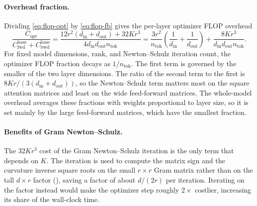 \documentclass[11pt]{article}
\theoremstyle{plain}
\theoremstyle{definition}
\theoremstyle{remark}
\theoremstyle{definition}
\begin{document}
\paragraph{Overhead fraction.} Dividing \eqref{eq:flop-opt} by \eqref{eq:flop-fb} gives the
per-layer optimizer FLOP overhead 
\begin{equation}
  \frac{C_{\mathrm{opt}}}{C_{\mathrm{fwd}}^{\mathrm{base}}
  +C_{\mathrm{bwd}}^{\mathrm{base}}}
  =
  \frac{
    12r^2(d_{\mathrm{in}}+d_{\mathrm{out}})
    +
    32Kr^3
  }{
    4d_{\mathrm{in}}d_{\mathrm{out}}n_{\mathrm{tok}}
  }
  =
  \frac{3r^2}{n_{\mathrm{tok}}}
  \left(
    \frac1{d_{\mathrm{in}}}
    +
    \frac1{d_{\mathrm{out}}}
  \right)
  +
  \frac{
    8Kr^3
  }{
    d_{\mathrm{in}}d_{\mathrm{out}}n_{\mathrm{tok}}
  } .
  \label{eq:flop-ratio}
\end{equation}
For fixed model dimensions, rank, and Newton--Schulz iteration count, the
optimizer FLOP fraction decays as $1/n_{\mathrm{tok}}$.
The first term is
governed by the smaller of the two layer dimensions. The ratio of the second term to the
first is $8Kr/(3(d_{\mathrm{in}}+d_{\mathrm{out}}))$, so the Newton--Schulz term matters
most on the square attention matrices and least on the wide feed-forward matrices.
The whole-model overhead averages these fractions with weights proportional to layer size,
so it is set mainly by the large feed-forward matrices, which have the smallest fraction.

\paragraph{Benefits of Gram Newton--Schulz.} The $32Kr^3$ cost of the Gram Newton--Schulz iteration is the only term that depends
on $K$. The iteration is used to compute the matrix sign and the curvature inverse square
roots on the small $r\times r$ Gram matrix rather than on the tall $d\times r$ factor
(), saving a factor of about $d/(2r)$ per iteration. Iterating on the factor
instead would make the optimizer step roughly $2\times$ costlier, increasing its share of
the wall-clock time.
\end{document}

